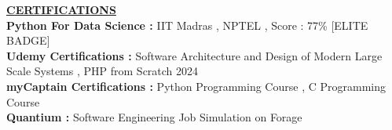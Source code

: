 \documentclass{article}
\begin{document}
\noindent \textbf{\underline{CERTIFICATIONS}} \\
\noindent \textbf{Python For Data Science :} IIT Madras , NPTEL , Score : 77\% [ELITE BADGE] \\
\noindent \textbf{Udemy Certifications :} Software Architecture and Design of Modern Large Scale Systems , PHP from Scratch 2024 \\
\noindent \textbf{myCaptain Certifications :} Python Programming Course , C Programming Course \\
\noindent \textbf{Quantium :} Software Engineering Job Simulation on Forage
\end{document}
